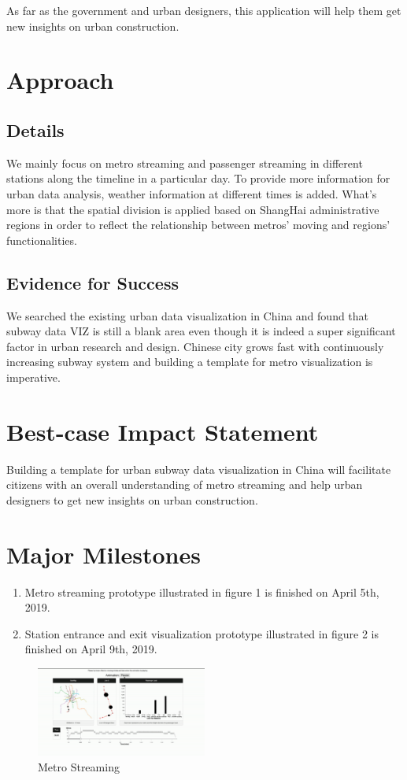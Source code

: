 \documentclass{proc}
\begin{document}
As far as the government and urban designers, this application will help them get new insights on urban construction.


\section{Approach}
\subsection{Details}
We mainly focus on metro streaming and passenger streaming in different stations along the timeline in a particular day. To provide more information for urban data analysis, weather information at different times is added. What’s more is that the spatial division is applied based on ShangHai administrative regions in order to reflect the relationship between metros’ moving and regions’ functionalities.\cite{InteractiveVisualization}
\subsection{Evidence for Success}
We searched the existing urban data visualization in China and found that subway data VIZ is still a blank area even though it is indeed a super significant factor in urban research and design. Chinese city grows fast with continuously increasing subway system and building a template for metro visualization is imperative.\cite{survey}

\section{Best-case Impact Statement}
Building a template for urban subway data visualization in China will facilitate citizens with an overall understanding of metro streaming and help urban designers to get new insights on urban construction.
\section{Major Milestones}
\begin{enumerate}
\item Metro streaming prototype illustrated in figure 1 is finished on April 5th, 2019.
\item Station entrance and exit visualization prototype illustrated in figure 2 is finished on April 9th, 2019.
\end{enumerate}

\begin{figure}[t]
	\centering
	\includegraphics[width=0.5\textwidth]{img/p1}
	\caption{Metro Streaming}
	\label{fig:curve}
\end{figure}
\end{document}
